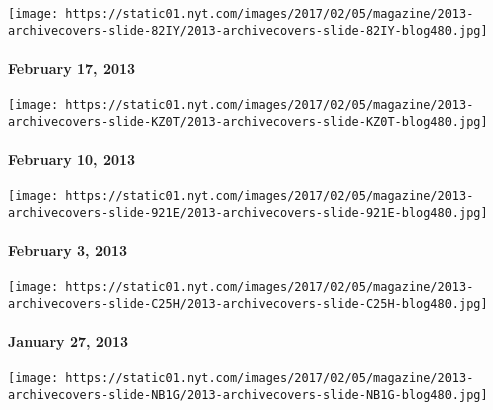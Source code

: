 \href{http://www.nytimes.com/indexes/2013/02/17/magazine/index.html}{}

\texttt{[image: https://static01.nyt.com/images/2017/02/05/magazine/2013-archivecovers-slide-82IY/2013-archivecovers-slide-82IY-blog480.jpg]}

\hypertarget{february-17-2013}{%
\paragraph{February 17, 2013}\label{february-17-2013}}

\href{http://www.nytimes.com/indexes/2013/02/10/magazine/index.html}{}

\texttt{[image: https://static01.nyt.com/images/2017/02/05/magazine/2013-archivecovers-slide-KZ0T/2013-archivecovers-slide-KZ0T-blog480.jpg]}

\hypertarget{february-10-2013}{%
\paragraph{February 10, 2013}\label{february-10-2013}}

\href{http://www.nytimes.com/indexes/2013/02/03/magazine/index.html}{}

\texttt{[image: https://static01.nyt.com/images/2017/02/05/magazine/2013-archivecovers-slide-921E/2013-archivecovers-slide-921E-blog480.jpg]}

\hypertarget{february-3-2013}{%
\paragraph{February 3, 2013}\label{february-3-2013}}

\href{http://www.nytimes.com/indexes/2013/01/27/magazine/index.html}{}

\texttt{[image: https://static01.nyt.com/images/2017/02/05/magazine/2013-archivecovers-slide-C25H/2013-archivecovers-slide-C25H-blog480.jpg]}

\hypertarget{january-27-2013}{%
\paragraph{January 27, 2013}\label{january-27-2013}}

\href{http://www.nytimes.com/indexes/2013/01/20/magazine/index.html}{}

\texttt{[image: https://static01.nyt.com/images/2017/02/05/magazine/2013-archivecovers-slide-NB1G/2013-archivecovers-slide-NB1G-blog480.jpg]}

